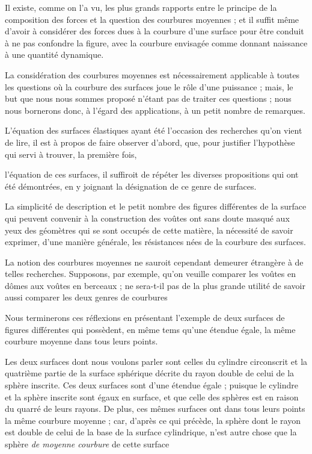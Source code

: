 \documentclass[11pt,a4paper]{article}
\begin{document}
Il existe, comme on l'a vu, les plus grands rapports entre le principe
de la composition des forces et la question des courbures moyennes ;
et il suffit même d'avoir à considérer des forces dues à la courbure
d'une surface pour être conduit à  ne pas confondre
la figure, avec la courbure envisagée comme donnant naissance à une
quantité dynamique.

La considération des courbures moyennes est nécessairement applicable
à toutes les questions où la courbure des surfaces joue le rôle d'une
puissance ; mais, le but que nous nous sommes proposé n'étant pas de
traiter ces questions ; nous nous bornerons donc, à l'égard des
applications, à un petit nombre de remarques.

L'équation des surfaces élastiques ayant été l'occasion des recherches
qu'on vient de lire, il est à propos de faire observer d'abord, que,
pour justifier l'hypothèse qui  servi à trouver, la
première fois,

l'équation de ces surfaces, il suffiroit de répéter les diverses
propositions qui ont été démontrées, en y joignant la désignation de ce
genre de surfaces.

La simplicité de description et le petit nombre des figures
différentes de la surface qui peuvent convenir à la construction des
voûtes ont sans doute masqué aux yeux des géomètres qui se sont
occupés de cette matière, la nécessité de savoir exprimer, d'une
manière générale, les résistances nées de la courbure des surfaces.

La notion des courbures moyennes ne sauroit cependant demeurer
étrangère à de telles recherches. Supposons, par exemple, qu'on
veuille comparer les voûtes en dômes aux voûtes en berceaux ; ne
sera-t-il pas de la plus grande utilité de savoir aussi comparer les
deux genres de courbures 

Nous terminerons ces réflexions en présentant l'exemple de deux
surfaces de figures différentes qui possèdent, en même tems qu'une
étendue égale, la même courbure moyenne dans tous leurs points.

Les deux surfaces dont nous voulons parler sont celles du cylindre
circonscrit et la quatrième partie de la surface sphérique décrite du
rayon double de celui de la sphère inscrite. Ces deux surfaces sont
d'une étendue égale ; puisque le cylindre et la sphère inscrite sont
égaux en surface, et que celle des sphères est en raison du quarré de
leurs rayons. De plus, ces mêmes surfaces ont dans tous leurs points
la même courbure moyenne ; car, d'après ce qui précède, la sphère dont
le rayon est double de celui de la base de la surface cylindrique,
n'est autre chose que la sphère \emph{de moyenne courbure} de cette
surface
\end{document}
